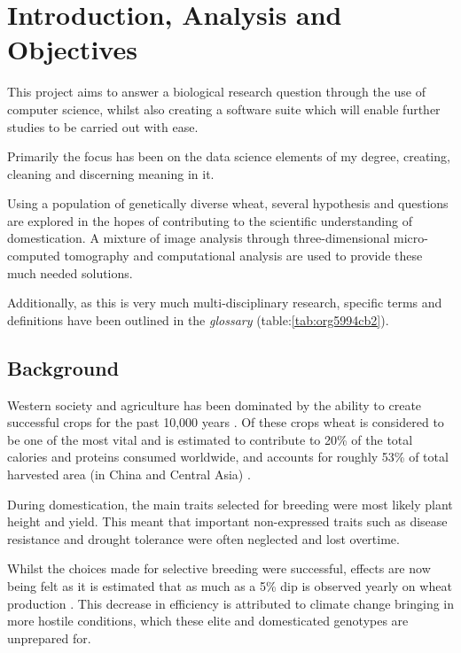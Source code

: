 \documentclass[11pt]{report}
\begin{document}
\chapter{Introduction, Analysis and Objectives}
\label{sec:orge8e869c}

This project aims to answer a biological research question through the use of computer science, whilst also creating a software suite which will enable further studies to be carried out with ease.

Primarily the focus has been on the data science elements of my degree, creating, cleaning and discerning meaning in it.

Using a population of genetically diverse wheat, several hypothesis and questions are explored in the hopes of contributing to the scientific understanding of domestication. A mixture of image analysis through three-dimensional micro-computed tomography and computational analysis are used to provide these much needed solutions.

Additionally, as this is very much multi-disciplinary research, specific terms and definitions have been outlined in the \emph{glossary} (table:\ref{tab:org5994cb2}).

\section{Background}
\label{sec:org1c1d2fd}

Western society and agriculture has been dominated by the ability to create successful crops for the past 10,000 years \cite{Ozkan2002}. Of these crops wheat is considered to be one of the most vital and is estimated to contribute to 20\% of the total calories and proteins consumed worldwide, and accounts for roughly 53\% of total harvested area (in China and Central Asia) \cite{Shiferaw2013}.

During domestication, the main traits selected for breeding were most likely plant height and yield. This meant that important non-expressed traits such as disease resistance and drought tolerance were often neglected and lost overtime.

Whilst the choices made for selective breeding were successful, effects are now being felt as it is estimated that as much as a 5\% dip is observed yearly on wheat production \cite{Shiferaw2013}. This decrease in efficiency is attributed to climate change bringing in more hostile conditions, which these elite and  domesticated genotypes are unprepared for.
\end{document}
